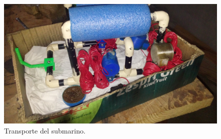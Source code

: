   \begin{figure}[!htbp]
 \centering
 \includegraphics [scale=0.1]
 {./img/20160427_003706.jpg}
 \caption{Transporte del submarino.}
 \end{figure}

  \pagebreak


